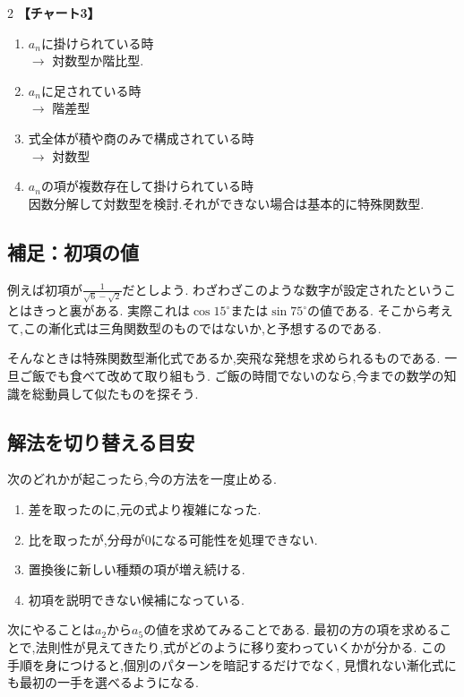 \documentclass[dvipdfmx,a4paper,11pt,fleqn,openany]{jsbook}
\begin{document}
\begin{multicols*}{2}
      \noindent \textbf{【チャート3】}
      \begin{enumerate}
        \item $a_n$に掛けられている時\\
              $\rightarrow$ 対数型か階比型.
        \item $a_n$に足されている時\\
              $\rightarrow$ 階差型
        \item 式全体が積や商のみで構成されている時\\
              $\rightarrow$ 対数型
        \item $a_n$の項が複数存在して掛けられている時\\
              因数分解して対数型を検討.それができない場合は基本的に特殊関数型.
      \end{enumerate}
      \subsection{補足：初項の値}
        例えば初項が$\displaystyle \frac{1}{\sqrt{6}-\sqrt{2}}$だとしよう.
        わざわざこのような数字が設定されたということはきっと裏がある.
        実際これは$\cos 15^\circ$または$\sin 75^\circ$の値である.
        そこから考えて,この漸化式は三角関数型のものではないか,と予想するのである.
  
    そんなときは特殊関数型漸化式であるか,突飛な発想を求められるものである.
    一旦ご飯でも食べて改めて取り組もう.
    ご飯の時間でないのなら,今までの数学の知識を総動員して似たものを探そう.
    \subsection{解法を切り替える目安}

    次のどれかが起こったら,今の方法を一度止める.

    \begin{enumerate}
      \item 差を取ったのに,元の式より複雑になった.
      \item 比を取ったが,分母が0になる可能性を処理できない.
      \item 置換後に新しい種類の項が増え続ける.
      \item 初項を説明できない候補になっている.
    \end{enumerate}
      次にやることは$a_2$から$a_5$の値を求めてみることである.
      最初の方の項を求めることで,法則性が見えてきたり,式がどのように移り変わっていくかが分かる.
    この手順を身につけると,個別のパターンを暗記するだけでなく,
    見慣れない漸化式にも最初の一手を選べるようになる.
\end{multicols*}
\end{document}
